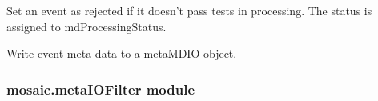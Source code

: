 \documentclass[letterpaper,10pt,english]{sphinxmanual}
\begin{document}
\begin{fulllineitems}
\begin{fulllineitems}
\label{api-doc/mosaic.meta:mosaic.metaEventProcessor.metaEventProcessor.rejectEvent}
Set an event as rejected if it doesn't pass tests in processing.
The status is assigned to mdProcessingStatus.

\end{fulllineitems}


\begin{fulllineitems}
\label{api-doc/mosaic.meta:mosaic.metaEventProcessor.metaEventProcessor.writeEvent}
Write event meta data to a metaMDIO object.

\end{fulllineitems}


\end{fulllineitems}



\subsubsection{mosaic.metaIOFilter module}
\label{api-doc/mosaic.meta:mosaic-metaiofilter-module}
\end{document}
